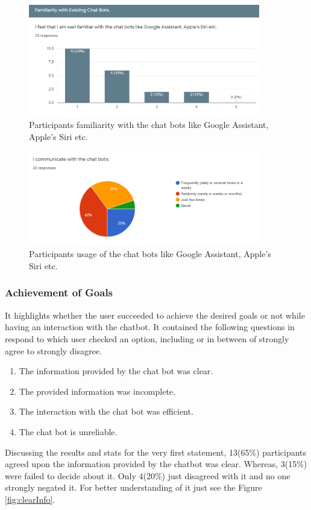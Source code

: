 \begin{figure}[!h]
    \centering
    \includegraphics[width=0.9\textwidth]{img/Familiraity.PNG}
    \caption{Participants familiarity with the chat bots like Google Assistant, Apple's Siri etc.}
    \label{fig:familiarity}
\end{figure}

\begin{figure}[!h]
    \centering
    \includegraphics[width=0.9\textwidth]{img/Communicate_Chatbots_Result.PNG}
    \caption{Participants usage of the chat bots like Google Assistant, Apple's Siri etc.}
    \label{fig:commChatRes}
\end{figure}

\subsubsection*{Achievement of Goals}
It highlights whether the user succeeded to achieve the desired goals or not while having an interaction with the chatbot. It contained the following questions in respond to which user checked an option, including or in between of strongly agree to strongly disagree.
\begin{enumerate}
    \item The information provided by the chat bot was clear.
    \item The provided information was incomplete.
    \item The interaction with the chat bot was efficient.
    \item The chat bot is unreliable.
\end{enumerate}
Discussing the results and stats for the very first statement, 13(65\%) participants agreed upon the information provided by the chatbot was clear. Whereas, 3(15\%) were failed to decide about it. Only 4(20\%) just disagreed with it and no one strongly negated it. For better understanding of it just see the Figure \ref{fig:clearInfo}.

